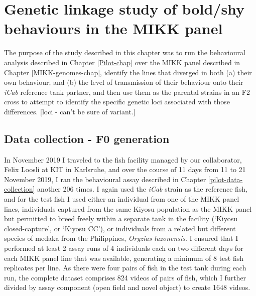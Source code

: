 \documentclass[
]{book}
\begin{document}
\hypertarget{MIKK-F2-chap}{%
\chapter{Genetic linkage study of bold/shy behaviours in the MIKK panel}\label{MIKK-F2-chap}}

The purpose of the study described in this chapter was to run the behavioural analysis described in Chapter \ref{Pilot-chap} over the MIKK panel described in Chapter \ref{MIKK-genomes-chap}, identify the lines that diverged in both (a) their own behaviour; and (b) the level of transmission of their behaviour onto their \emph{\textcolor{iCab_424B4D}{iCab}} reference tank partner, and then use them as the parental strains in an F2 cross to attempt to identify the specific genetic loci associated with those differences. {[}loci - can't be sure of variant.{]}

\hypertarget{data-collection---f0-generation}{%
\section{Data collection - F0 generation}\label{data-collection---f0-generation}}

In November 2019 I traveled to the fish facility managed by our collaborator, Felix Loosli at KIT in Karlsruhe, and over the course of 11 days from 11 to 21 November 2019, I ran the behavioural assay described in Chapter \ref{pilot-data-collection} another 206 times. I again used the \emph{\textcolor{iCab_424B4D}{iCab}} strain as the reference fish, and for the test fish I used either an individual from one of the MIKK panel lines, individuals captured from the same Kiyosu population as the MIKK panel but permitted to breed freely within a separate tank in the facility (`Kiyosu closed-capture', or `Kiyosu CC'), or individuals from a related but different species of medaka from the Philippines, \emph{Oryzias luzonensis}. I ensured that I performed at least 2 assay runs of 4 individuals each on two different days for each MIKK panel line that was available, generating a minimum of 8 test fish replicates per line. As there were four pairs of fish in the test tank during each run, the complete dataset comprises 824 videos of pairs of fish, which I further divided by assay component (open field and novel object) to create 1648 videos.
\end{document}
